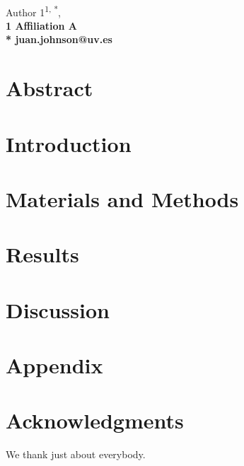\documentclass[10pt,letterpaper]{article}
\begin{document}
\vspace*{0.35in}

\begin{flushleft}
{\Large
\textbf{}
}
\newline
\\
Author 1\textsuperscript{1, *},
\\
\bigskip
\bf{1} Affiliation A
\\
\bigskip
* juan.johnson@uv.es

\end{flushleft}

\section*{Abstract}



\linenumbers

\section*{Introduction}


\section*{Materials and Methods}



\section*{Results}



\section*{Discussion}


\section*{Appendix}


\section*{Acknowledgments}
We thank just about everybody.

\nolinenumbers




\end{document}
